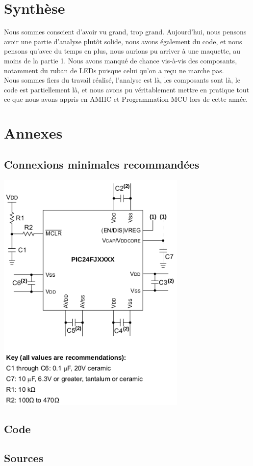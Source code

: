 \documentclass[12pt]{report}
\begin{document}
	\chapter{Synthèse}
	Nous sommes conscient d'avoir vu grand, trop grand. Aujourd'hui, nous pensons avoir une partie d'analyse plutôt solide, nous avons également du code, et nous pensons qu'avec du temps en plus, nous aurions pu arriver à une maquette, au moins de la partie 1. Nous avons manqué de chance vis-à-vis des composants, notamment du ruban de LEDs puisque celui qu'on a reçu ne marche pas.\\
	Nous sommes fiers du travail réalisé, l'analyse est là, les composants sont là, le code est partiellement là, et nous avons pu véritablement mettre en pratique tout ce que nous avons appris en AMIIC et Programmation MCU lors de cette année.\\
	\chapter{Annexes}
	\section{Connexions minimales recommandées}
	\label{sec:an3.1}
	\includegraphics[width=0.7\textwidth]{img/an1}
	\section{Code}
	\section{Sources}
\end{document}
